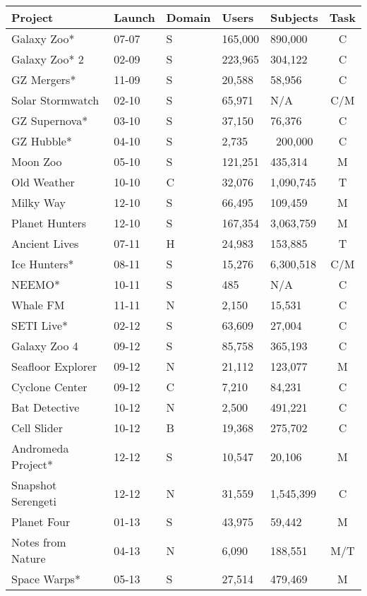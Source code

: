 \documentclass{sigchi}
\begin{document}
\begin{spacing}{0.97}
\begin{spacing}{0.8}
\begin{table}[t]
\begin{center}
\small
\begin{tabular}{p{2.15cm}lp{0.7cm}llc}
\hline
Project & Launch & Domain & Users & Subjects & Task \\
\hline
\hline
Galaxy Zoo* & 07-07 & S & 165,000 & 890,000 & C \\
\hline
Galaxy Zoo* 2 & 02-09 & S & 223,965 & 304,122 & C \\
GZ Mergers* & 11-09 & S & 20,588 & 58,956 & C \\
\hline
Solar Stormwatch & 02-10 & S & 65,971 & N/A & C/M \\
GZ Supernova* & 03-10 & S & 37,150 & 76,376 & C \\
GZ Hubble* & 04-10 & S & 2,735 & ~200,000 & C \\
Moon Zoo & 05-10 & S & 121,251 & 435,314 & M \\
Old Weather & 10-10 & C & 32,076 & 1,090,745 & T \\
Milky Way & 12-10 & S & 66,495 & 109,459 & M \\
Planet Hunters & 12-10 & S & 167,354 & 3,063,759 & M \\
\hline
Ancient Lives & 07-11 & H & 24,983 & 153,885 & T \\
Ice Hunters* & 08-11 & S & 15,276 & 6,300,518 & C/M \\
NEEMO* & 10-11 & S & 485 & N/A & C \\
Whale FM & 11-11 & N & 2,150 & 15,531 & C \\
\hline
SETI Live* & 02-12 & S & 63,609 & 27,004 & C \\
Galaxy Zoo 4 & 09-12 & S & 85,758 & 365,193 & C \\
Seafloor Explorer & 09-12 & N & 21,112 & 123,077 & M \\
Cyclone Center & 09-12 & C & 7,210 & 84,231 & C \\
Bat Detective & 10-12 & N & 2,500 & 491,221 & C \\
Cell Slider & 10-12 & B & 19,368 & 275,702 & C \\
Andromeda Project* & 12-12 & S & 10,547 & 20,106 & M \\
Snapshot Serengeti & 12-12 & N & 31,559 & 1,545,399 & C \\
\hline
Planet Four & 01-13 & S & 43,975 & 59,442 & M \\
Notes from Nature & 04-13 & N & 6,090 & 188,551 & M/T \\
Space Warps* & 05-13 & S & 27,514 & 479,469 & M \\

\end{tabular}
\end{center}
\end{table}
\end{spacing}
\end{spacing}
\end{document}
